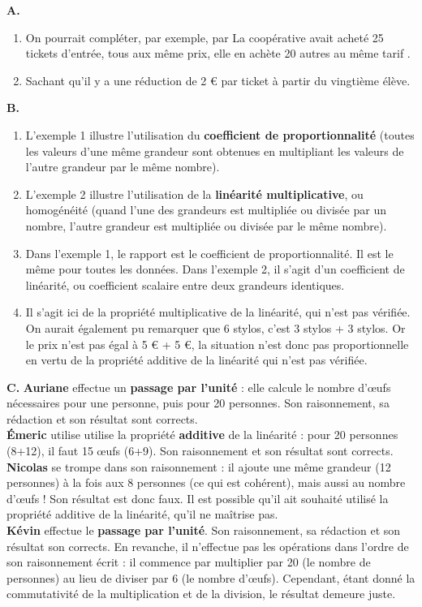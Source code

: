 {\bf A.}
\begin{enumerate}
   \item On pourrait compléter, par exemple, par \og La coopérative avait acheté 25 tickets d'entrée, tous aux même prix, elle en achète 20 autres au même tarif \fg.
   \item \og Sachant qu'il y a une réduction de 2 \euro{} par ticket à partir du vingtième élève. \fg{} \\
\end{enumerate}

{\bf B.}
\begin{enumerate}
   \item L'exemple 1 illustre l'utilisation du {\bf coefficient de proportionnalité} (toutes les valeurs d'une même grandeur sont obtenues en multipliant les valeurs de l'autre grandeur par le même nombre).
   \item L'exemple 2 illustre l'utilisation de la {\bf linéarité multiplicative}, ou homogénéité (quand l'une des grandeurs est multipliée ou divisée par un nombre, l'autre grandeur est multipliée ou divisée par le même nombre).
   \item Dans l'exemple 1, le rapport est le coefficient de proportionnalité. Il est le même pour toutes les données. Dans l'exemple 2, il s'agit d'un coefficient de linéarité, ou coefficient scalaire entre deux grandeurs identiques.
   \item Il s'agit ici de la propriété multiplicative de la linéarité, qui n'est pas vérifiée. \\
   On aurait également pu remarquer que 6 stylos, c'est 3 stylos + 3 stylos. Or le prix n'est pas égal à 5 \euro{} + 5 \euro{}, la situation n'est donc pas proportionnelle en vertu de la propriété additive de la linéarité qui n'est pas vérifiée. \\
\end{enumerate}

{\bf C.} {\bf Auriane} effectue un {\bf passage par l'unité} : elle calcule le nombre d'\oe ufs nécessaires pour une personne, puis pour 20 personnes. Son raisonnement, sa rédaction et son résultat sont corrects. \\
   {\bf Émeric} utilise utilise la propriété {\bf additive} de la linéarité : pour 20 personnes (8+12), il faut 15 \oe ufs (6+9). Son raisonnement et son résultat sont corrects. \\
   {\bf Nicolas} se trompe dans son raisonnement : il ajoute une même grandeur (12 personnes) à la fois aux 8 personnes (ce qui est cohérent), mais aussi au nombre d'\oe ufs ! Son résultat est donc faux. Il est possible qu'il ait souhaité utilisé la propriété additive de la linéarité, qu'il ne maîtrise pas. \\
   {\bf Kévin} effectue le {\bf passage par l'unité}. Son raisonnement, sa rédaction et son résultat son corrects. En revanche, il n'effectue pas les opérations dans l'ordre de son raisonnement écrit : il commence par multiplier par 20 (le nombre de personnes) au lieu de diviser par 6 (le nombre d'\oe ufs). Cependant, étant donné la commutativité de la multiplication et de la division, le résultat demeure juste. \\

